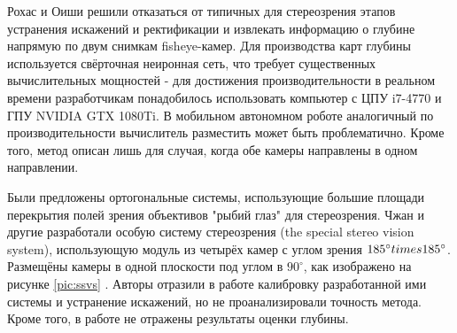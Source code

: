 Рохас и Оиши \cite{direct_neuro_stereo} решили отказаться от типичных для стереозрения этапов устранения искажений и ректификации %
и извлекать информацию о глубине напрямую по двум снимкам fisheye-камер. Для производства карт глубины используется 
свёрточная неиронная сеть, что требует существенных вычислительных мощностей - для достижения производительности в реальном 
времени разработчикам понадобилось использовать компьютер с ЦПУ i7-4770 и ГПУ NVIDIA GTX 1080Ti. В мобильном автономном роботе
аналогичный по производительности вычислитель разместить может быть проблематично. Кроме того, метод описан лишь для случая, когда
 обе камеры направлены в одном направлении. 

Были предложены ортогональные системы, использующие большие площади перекрытия полей зрения объективов "рыбий глаз" для 
стереозрения. %
Чжан и другие разработали особую систему стереозрения (the special stereo vision system), использующую модуль из четырёх камер с углом зрения
$185^\circ \\times 185^\circ$. Размещёны камеры в одной плоскости под углом в $90^\circ$, как изображено на рисунке \ref{pic:ssvs} \cite{zhang_system}.
Авторы отразили в работе калибровку разработанной ими системы и устранение искажений, но не проанализировали точность метода. Кроме того,
в работе не отражены  результаты  оценки глубины. 


